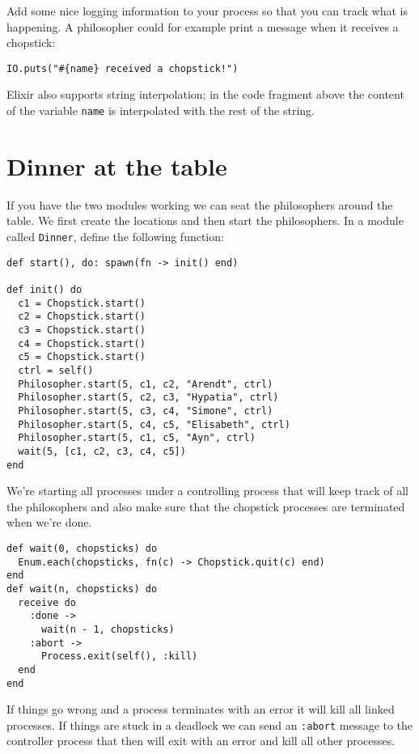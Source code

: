 \documentclass[a4paper,11pt]{article}
\begin{document}
Add some nice logging information to your process so that you can
track what is happening. A philosopher could for example print a
message when it receives a chopstick:

\begin{verbatim}
IO.puts("#{name} received a chopstick!")
\end{verbatim}

Elixir also supports string interpolation; in the code fragment above the content of the variable {\tt name} is interpolated with the rest of the string.



\section{Dinner at the table}

If you have the two modules working we can seat the philosophers
around the table. We first create the locations and then start the
philosophers. In a module called {\tt Dinner}, define the following
function:

\begin{verbatim}
def start(), do: spawn(fn -> init() end)

def init() do
  c1 = Chopstick.start()    
  c2 = Chopstick.start()
  c3 = Chopstick.start()
  c4 = Chopstick.start()
  c5 = Chopstick.start()
  ctrl = self()
  Philosopher.start(5, c1, c2, "Arendt", ctrl)
  Philosopher.start(5, c2, c3, "Hypatia", ctrl)
  Philosopher.start(5, c3, c4, "Simone", ctrl)
  Philosopher.start(5, c4, c5, "Elisabeth", ctrl)
  Philosopher.start(5, c1, c5, "Ayn", ctrl)
  wait(5, [c1, c2, c3, c4, c5])
end
\end{verbatim}

We're starting all processes under a controlling process that will keep
track of all the philosophers and also make sure that the chopstick
processes are terminated when we're done.

\begin{verbatim}
def wait(0, chopsticks) do
  Enum.each(chopsticks, fn(c) -> Chopstick.quit(c) end)
end
def wait(n, chopsticks) do
  receive do
    :done ->
      wait(n - 1, chopsticks)
    :abort ->
      Process.exit(self(), :kill)
  end
end
\end{verbatim}

If things go wrong and a process terminates with an error it will kill
all linked processes. If things are stuck in a deadlock we can send
an {\tt :abort} message to the controller process that then will exit
with an error and kill all other processes.
\end{document}
